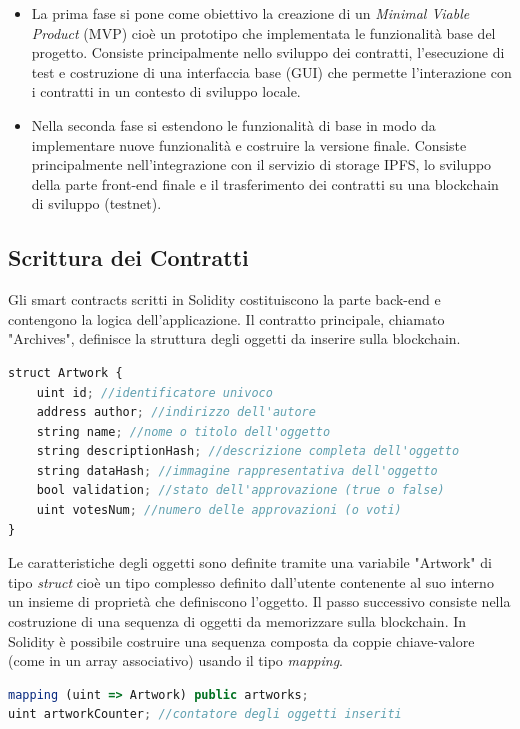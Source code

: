 \begin{itemize}

\item La prima fase si pone come obiettivo la creazione di un \emph{Minimal Viable Product} (MVP) cioè un prototipo che  implementata le funzionalità base del progetto. Consiste principalmente nello sviluppo dei contratti, l'esecuzione di test e costruzione di una interfaccia base (GUI) che permette l'interazione con i contratti in un contesto di sviluppo locale.

\item Nella seconda fase si estendono le funzionalità di base in modo da implementare nuove funzionalità e costruire la versione finale. Consiste principalmente nell'integrazione con il servizio di storage IPFS, lo sviluppo della parte front-end finale e il trasferimento dei contratti su una blockchain di sviluppo (testnet).

\end{itemize}

\subsection{Scrittura dei Contratti}

Gli smart contracts scritti in Solidity costituiscono la parte back-end e contengono la logica dell'applicazione. Il contratto principale, chiamato "Archives", definisce la struttura degli oggetti da inserire sulla blockchain.
\\
\begin{lstlisting}[caption={Struttura degli oggetti},language=JavaScript]
struct Artwork {
    uint id; //identificatore univoco
    address author; //indirizzo dell'autore
    string name; //nome o titolo dell'oggetto
    string descriptionHash; //descrizione completa dell'oggetto
    string dataHash; //immagine rappresentativa dell'oggetto
    bool validation; //stato dell'approvazione (true o false)
    uint votesNum; //numero delle approvazioni (o voti)
}
\end{lstlisting}

Le caratteristiche degli oggetti sono definite tramite una variabile "Artwork" di tipo \emph{struct} cioè un tipo complesso definito dall'utente contenente al suo interno un insieme di proprietà che definiscono l'oggetto. Il passo successivo consiste nella costruzione di una sequenza di oggetti da memorizzare sulla blockchain. In Solidity è possibile costruire una sequenza composta da coppie chiave-valore (come in un array associativo) usando il tipo \emph{mapping}.
\\
\begin{lstlisting}[caption={Struttura degli oggetti},language=JavaScript]
mapping (uint => Artwork) public artworks;
uint artworkCounter; //contatore degli oggetti inseriti 
\end{lstlisting}

